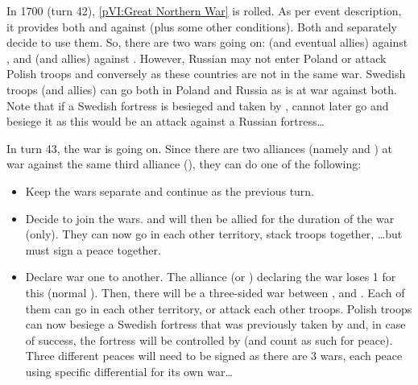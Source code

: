 \begin{exemple}
  In 1700 (turn 42), \ref{pVI:Great Northern War} is rolled. As per event
  description, it provides both \RUS and \POL \CB against \SUE (plus some
  other conditions). Both \RUS and \POL separately decide to use them. So,
  there are two wars going on: \RUS (and eventual allies) against \SUE, and
  \POL (and allies) against \SUE. However, Russian may not enter Poland or
  attack Polish troops and conversely as these countries are not in the same
  war. Swedish troops (and allies) can go both in Poland and Russia as \SUE is
  at war against both. Note that if a Swedish fortress is besieged and taken
  by \RUS, \POL cannot later go and besiege it as this would be an attack
  against a Russian fortress\ldots

  In turn 43, the war is going on. Since there are two alliances (namely \RUS
  and \POL) at war against the same third alliance (\SUE), they can do one of
  the following:
  \begin{itemize}
  \item Keep the wars separate and continue as the previous turn.
  \item Decide to join the wars. \RUS and \POL will then be allied for the
    duration of the war (only). They can now go in each other territory, stack
    troops together, \ldots but must sign a peace together.
  \item Declare war one to another. The alliance (\RUS or \POL) declaring the
    war loses 1 \STAB for this (normal \CB). Then, there will be a three-sided
    war between \SUE, \RUS and \POL. Each of them can go in each other
    territory, or attack each other troops. Polish troops can now besiege a
    Swedish fortress that was previously taken by \RUS and, in case of
    success, the fortress will be controlled by \POL (and count as such for
    peace). Three different peaces will need to be signed as there are 3 wars,
    each peace using specific differential for its own war\ldots
  \end{itemize}
\end{exemple}


